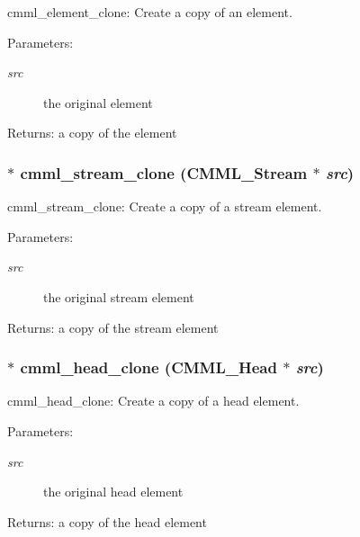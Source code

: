 cmml\_\-element\_\-clone: Create a copy of an element.

\begin{Desc}
\item[Parameters:]
\begin{description}
\item[{\em src}]the original element\end{description}
\end{Desc}
\begin{Desc}
\item[Returns:]a copy of the element \end{Desc}
\subsubsection{$\ast$ cmml\_\-stream\_\-clone ({\bf CMML\_\-Stream} $\ast$ {\em src})}\label{cmml_8h_a64}


cmml\_\-stream\_\-clone: Create a copy of a stream element.

\begin{Desc}
\item[Parameters:]
\begin{description}
\item[{\em src}]the original stream element\end{description}
\end{Desc}
\begin{Desc}
\item[Returns:]a copy of the stream element \end{Desc}
\subsubsection{$\ast$ cmml\_\-head\_\-clone ({\bf CMML\_\-Head} $\ast$ {\em src})}\label{cmml_8h_a65}


cmml\_\-head\_\-clone: Create a copy of a head element.

\begin{Desc}
\item[Parameters:]
\begin{description}
\item[{\em src}]the original head element\end{description}
\end{Desc}
\begin{Desc}
\item[Returns:]a copy of the head element \end{Desc}
